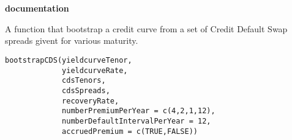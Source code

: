 \documentclass[a4paper]{book}
\begin{document}
\chapter*{}
\begin{center}
{\textbf{\huge \R{} documentation}} \par{}
\par\bigskip{\large \today}
\end{center}
%
\begin{Description}\relax
A function that bootstrap a credit curve from a set of Credit Default Swap spreads givent for various maturity.
\end{Description}
%
\begin{Usage}
\begin{verbatim}
bootstrapCDS(yieldcurveTenor,
			 yieldcurveRate,
			 cdsTenors,
			 cdsSpreads,
			 recoveryRate,
			 numberPremiumPerYear = c(4,2,1,12),
			 numberDefaultIntervalPerYear = 12,
			 accruedPremium = c(TRUE,FALSE)) 
\end{verbatim}
\end{Usage}
%
\end{document}
